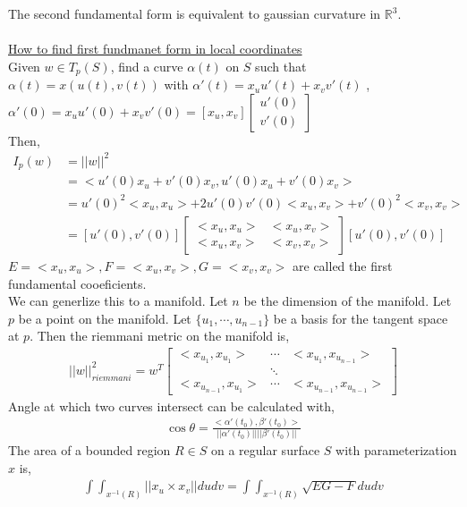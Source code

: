 \documentclass[12pt,letterpaper]{hmcpset}
\begin{document}
The second fundamental form is equivalent to gaussian curvature in
$\mathbb{R}^3$. \\\\

\underline{How to find first fundmanet form in local coordinates} \\
Given $w \in T_p(S)$, find a curve $\alpha(t)$ on $S$ such that $\alpha(t) = x(u(t), v(t))$
with $\alpha'(t) = x_uu'(t) + x_v v'(t)$ , $\alpha'(0) = x_u u'(0) + x_v v'(0) = [x_u,
x_v]\begin{bmatrix}u'(0)\\v'(0)\end{bmatrix}$\\
Then,
\begin{align*}
  I_p(w) &= ||w||^2 \\
  &= <u'(0)x_u + v'(0)x_v, u'(0)x_u + v'(0)x_v> \\
  &= u'(0)^2<x_u, x_u> + 2u'(0)v'(0)<x_u, x_v> + v'(0)^2<x_v, x_v> \\
  &= [u'(0), v'(0)]\begin{bmatrix}<x_u, x_u> & <x_u, x_v>\\<x_u, x_v>&<x_v, x_v>\end{bmatrix}[u'(0), v'(0)]
\end{align*}
$E=<x_u, x_u>, F=<x_u, x_v>, G=<x_v, x_v>$ are called the first fundamental
cooeficients. \\
We can generlize this to a manifold. Let $n$ be the dimension of the manifold. Let $p$ be a point on the manifold. Let
$\{u_1, \cdots, u_{n-1}\}$ be a basis for the tangent space at $p$. Then the
riemmani metric on the manifold is,
\begin{align*}
  ||w||_{riemmani}^2 = w^T \begin{bmatrix}<x_{u_1}, x_{u_1}> & \cdots & <x_{u_1}, x_{u_{n-1}}>\\
    & \ddots & \\
    <x_{u_{n-1}}, x_{u_1}> & \cdots & <x_{u_{n-1}}, x_{u_{n-1}}>
\end{bmatrix}
\end{align*}
Angle at which two curves intersect can be calculated with,
\begin{align*}
  \cos \theta = \frac{<\alpha'(t_0), \beta'(t_0)>}{||\alpha'(t_0)|| ||\beta'(t_0)||}
\end{align*}
The area of a bounded region $R \in S$ on a regular surface $S$ with
parameterization $x$ is,
\begin{align*}
  \int\int_{x^{-1}(R)} ||x_u \times x_v|| du dv = \int\int_{x^{-1}(R)} \sqrt{EG - F} du dv
\end{align*}
\end{document}
